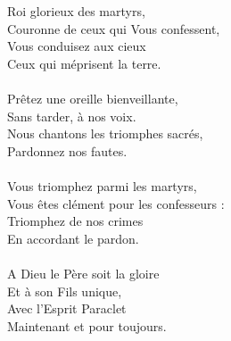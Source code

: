 Roi glorieux des martyrs,\\
Couronne de ceux qui Vous confessent,\\
Vous conduisez aux cieux\\
Ceux qui méprisent la terre.\\
\\
Prêtez une oreille bienveillante,\\
Sans tarder, à nos voix.\\
Nous chantons les triomphes sacrés,\\
Pardonnez nos fautes.\\
\\
Vous triomphez parmi les martyrs, \\
Vous êtes clément pour les confesseurs :\\
Triomphez de nos crimes\\
En accordant le pardon.\\
\\
A Dieu le Père soit la gloire\\
Et à son Fils unique,\\
Avec l’Esprit Paraclet\\
Maintenant et pour toujours.